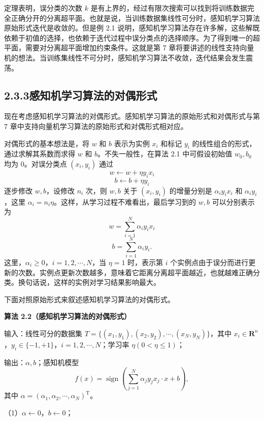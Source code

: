 \documentclass[UTF8, 12pt, fontset=fandol, oneside]{ctexart}
\begin{document}
定理表明，误分类的次数 $k$ 是有上界的，经过有限次搜索可以找到将训练数据完全正确分开的分离超平面。也就是说，当训练数据集线性可分时，感知机学习算法原始形式迭代是收敛的。但是例 2.1 说明，感知机学习算法存在许多解，这些解既依赖于初值的选择，也依赖于迭代过程中误分类点的选择顺序。为了得到唯一的超平面，需要对分离超平面增加约束条件。这就是第 7 章将要讲述的线性支持向量机的想法。当训练集线性不可分时，感知机学习算法不收敛，迭代结果会发生震荡。

\subsection*{2.3.3\quad 感知机学习算法的对偶形式}

现在考虑感知机学习算法的对偶形式。感知机学习算法的原始形式和对偶形式与第 7 章中支持向量机学习算法的原始形式和对偶形式相对应。

对偶形式的基本想法是，将 $w$ 和 $b$ 表示为实例 $x_i$ 和标记 $y_i$ 的线性组合的形式，通过求解其系数而求得 $w$ 和 $b$。不失一般性，在算法 2.1 中可假设初始值 $w_0,b_0$ 均为 0。对误分类点 $(x_i,y_i)$ 通过
\[
  w\leftarrow w+\eta y_ix_i
\]
\[
  b\leftarrow b+\eta y_i
\]
逐步修改 $w,b$，设修改 $n_i$ 次，则 $w,b$ 关于 $(x_i,y_i)$ 的增量分别是 $\alpha_iy_ix_i$ 和 $\alpha_iy_i$，这里 $\alpha_i=n_i\eta$。这样，从学习过程不难看出，最后学习到的 $w,b$ 可以分别表示为
\begin{equation}
  w=\sum_{i=1}^N\alpha_iy_ix_i
  \tag{2.14}
\end{equation}
\begin{equation}
  b=\sum_{i=1}^N\alpha_iy_i.
  \tag{2.15}
\end{equation}
这里，$\alpha_i\ge 0$，$i=1,2,\cdots,N$，当 $\eta=1$ 时，表示第 $i$ 个实例点由于误分而进行更新的次数。实例点更新次数越多，意味着它距离分离超平面越近，也就越难正确分类。换句话说，这样的实例对学习结果影响最大。

下面对照原始形式来叙述感知机学习算法的对偶形式。

\noindent\textbf{算法 2.2（感知机学习算法的对偶形式）}

\noindent 输入：线性可分的数据集 $T=\{(x_1,y_1),(x_2,y_2),\cdots,(x_N,y_N)\}$，其中 $x_i\in\mathbf{R}^n$，$y_i\in\{-1,+1\}$，$i=1,2,\cdots,N$；学习率 $\eta(0<\eta\le 1)$；

\noindent 输出：$\alpha,b$；感知机模型
\[
  f(x)=\operatorname{sign}\left(\sum_{j=1}^N\alpha_jy_jx_j\cdot x+b\right),
\]
其中 $\alpha=(\alpha_1,\alpha_2,\cdots,\alpha_N)^\mathrm{T}$。

（1）$\alpha\leftarrow 0$，$b\leftarrow 0$；
\end{document}
